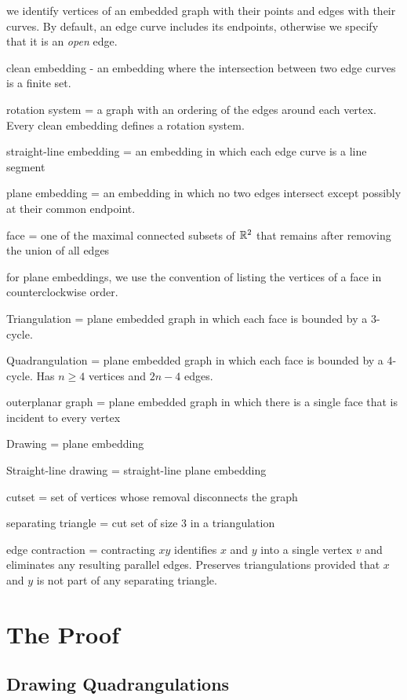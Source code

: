 \documentclass{patmorin}
\begin{document}
we identify vertices of an embedded graph with their points and edges with their curves. By default, an edge curve includes its endpoints, otherwise we specify that it is an \emph{open} edge.

clean embedding - an embedding where the intersection between two edge curves is a finite set.  

rotation system = a graph with an ordering of the edges around each vertex. Every clean embedding defines a rotation system.

straight-line embedding = an embedding in which each edge curve is a line segment

plane embedding = an embedding in which no two edges intersect except possibly at their common endpoint.

face = one of the maximal connected subsets of $\mathbb{R}^2$ that remains after removing the union of all edges

for plane embeddings, we use the convention of listing the vertices of a face in counterclockwise order.

Triangulation = plane embedded graph in which each face is bounded by a 3-cycle.

Quadrangulation = plane embedded graph in which each face is bounded by a 4-cycle. Has $n\ge 4$ vertices and $2n-4$ edges.

outerplanar graph = plane embedded graph in which there is a single face that is incident to every vertex

Drawing = plane embedding 

Straight-line drawing = straight-line plane embedding

cutset = set of vertices whose removal disconnects the graph

separating triangle = cut set of size 3 in a triangulation

edge contraction = contracting $xy$ identifies $x$ and $y$ into a single vertex $v$ and eliminates any resulting parallel edges.  Preserves triangulations provided that $x$ and $y$ is not part of any separating triangle.


\section{The Proof}

\subsection{Drawing Quadrangulations}
\end{document}
